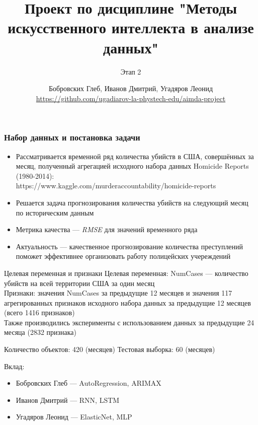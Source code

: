 \documentclass[aspectratio=169,8pt]{beamer}
\title[Проект по дисциплине МИИАД] {Проект по дисциплине "Методы искусственного интеллекта в анализе данных"}
\subtitle{Этап 2}
\author[Бобровских, Иванов, Угадяров] {Бобровских Глеб, Иванов Дмитрий, Угадяров Леонид \\ \tiny\url{https://github.com/ugadiarov-la-phystech-edu/aimda-project}}
\institute{Группа 4}
\begin{document}
\begin{frame}
\titlepage
\end{frame}

\begin{frame}
\frametitle{Набор данных и постановка задачи}

\begin{itemize}
\item { Рассматривается временной ряд количества убийств в США, совершённых за месяц, полученный агрегацией исходного набора данных Homicide Reports (1980-2014):\\https://www.kaggle.com/murderaccountability/homicide-reports }
\item Решается задача прогнозирования количества убийств на следующий месяц по историческим данным
\item Метрика качества --- \emph {RMSE} для значений временного ряда
\item {Актуальность --- качественное прогнозирование количества преступлений поможет эффективнее организовать работу полицейских учереждений  }
\end{itemize}

\begin{block}{Целевая переменная и признаки}
Целевая переменная: NumCases --- количество убийств на всей территории США за один месяц\\
Признаки: значения NumCases за предыдущие 12 месяцев и значения 117 агрегированных признаков исходного набора данных за предыдущие 12 месяцев (всего 1416 признаков)\\
Также производились эксперименты с использованием данных за предыдущие 24 месяца (2832 признака)
\end{block}

Количество объектов:  420 (месяцев)\newline
Тестовая выборка: 60 (месяцев) \newline

Вклад:
\begin{itemize}
\item Бобровских Глеб --- AutoRegression, ARIMAX
\item Иванов Дмитрий --- RNN, LSTM
\item Угадяров Леонид --- ElasticNet, MLP
\end{itemize}

\end{frame}
\end{document}
